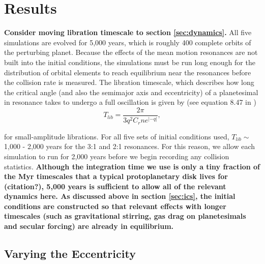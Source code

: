 \documentclass[fleqn,usenatbib]{mnras}
\begin{document}
\section{Results} \label{sec:results}

\textbf{Consider moving libration timescale to section \ref{sec:dynamics}.} All five simulations are evolved for 5,000 years, which is roughly 400 complete orbits of the perturbing planet. Because the effects of the mean 
motion resonances are not built into the initial conditions, the simulations must be run long enough for the distribution of orbital elements to reach 
equilibrium near the resonances before the collision rate is measured. The libration timescale, which describes how long the critical angle (and also 
the semimajor axis and eccentricity) of a planetesimal in resonance takes to undergo a full oscillation is given by (see equation 8.47 in \citet{1999ssd..book.....M})
\begin{equation}\label{eq:lib_time}
	T_{lib} = \frac{2 \pi}{3 q^{2} C_{r} n e^{\left| -q \right|}},
\end{equation}

\noindent for small-amplitude librations. For all five sets of initial conditions used, $T_{lib} \sim$ 1,000 - 2,000 years for the 3:1 and 2:1 resonances. 
For this reason, we allow each simulation to run for 2,000 years before we begin recording any collision statistics. \textbf{Although the integration time we use
is only a tiny fraction of the Myr timescales that a typical protoplanetary disk lives for (citation?), 5,000 years is sufficient to allow all of the relevant dynamics here.
As discussed above in section \ref{sec:ics}, the initial conditions are constructed so that relevant effects with longer timescales (such as gravitational stirring, gas drag on planetesimals and secular forcing) are already in equilibrium.}

\subsection{Varying the Eccentricity} \label{sec:vary_ecc}
\end{document}
